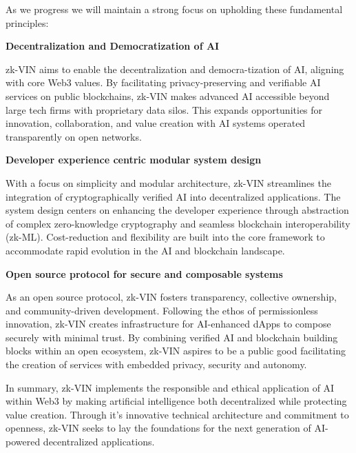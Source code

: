 \documentclass[conference]{IEEEtran}
\begin{document}
As we progress we will maintain a strong focus on upholding these fundamental principles:

\textbf{Decentralization and Democratization of AI}

zk-VIN aims to enable the decentralization and democra-tization of AI, aligning with core Web3 values. By facilitating privacy-preserving and veriﬁable AI services on public blockchains, zk-VIN makes advanced AI accessible beyond large tech ﬁrms with proprietary data silos. This expands opportunities for innovation, collaboration, and value creation with AI systems operated transparently on open networks.

\textbf{Developer experience centric modular system design}

With a focus on simplicity and modular architecture, zk-VIN streamlines the integration of cryptographically veriﬁed AI into decentralized applications. The system design centers on enhancing the developer experience through abstraction of complex zero-knowledge cryptography and seamless blockchain interoperability (zk-ML). Cost-reduction and ﬂexibility are built into the core framework to accommodate rapid evolution in the AI and blockchain landscape.

\textbf{Open source protocol for secure and composable systems}

As an open source protocol, zk-VIN fosters transparency, collective ownership, and community-driven development. Following the ethos of permissionless innovation, zk-VIN creates infrastructure for AI-enhanced dApps to compose securely with minimal trust. By combining veriﬁed AI and blockchain building blocks within an open ecosystem, zk-VIN aspires to be a public good facilitating the creation of services with embedded privacy, security and autonomy.

In summary, zk-VIN implements the responsible and ethical application of AI within Web3 by making artiﬁcial intelligence both decentralized while protecting value creation. Through it’s innovative technical architecture and commitment to openness, zk-VIN seeks to lay the foundations for the next generation of AI-powered decentralized applications.




















%
%


\clearpage
\printendnotes
\end{document}
